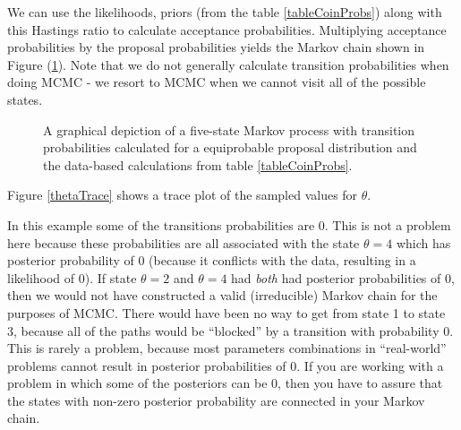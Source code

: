 \documentclass[11pt]{article}
\begin{document}
We can use the likelihoods, priors (from the table \ref{tableCoinProbs}) along with this Hastings ratio to calculate acceptance probabilities.
Multiplying acceptance probabilities by the proposal probabilities yields the Markov chain shown in Figure (\ref{fig5stateConcrete}).
Note that we do not generally calculate transition probabilities when doing MCMC - we resort to MCMC when we cannot visit all of the possible states.
\begin{figure}[h]
\caption{A graphical depiction of a five-state Markov process with transition probabilities calculated for a equiprobable proposal distribution and the data-based calculations from table \ref{tableCoinProbs}. }\label{fig5stateConcrete}
\end{figure}

Figure \ref{thetaTrace} shows a trace plot of the sampled values for $\theta$.

In this example some of the transitions probabilities are 0.
This is not a problem here because these probabilities are all associated with the state $\theta=4$ which has posterior probability of 0 (because it conflicts with the data, resulting in a likelihood of 0).
If state $\theta=2$ and $\theta=4$ had {\em both} had posterior probabilities of 0, then we would not have constructed a valid (irreducible) Markov chain for the purposes of MCMC.  
There would have been no way to get from state 1 to state 3, because all of the paths would be ``blocked'' by a transition with probability 0.
This is rarely a problem, because most parameters combinations in ``real-world'' problems cannot result in posterior probabilities of 0.
If you are working with a problem in which some of the posteriors can be 0, then you have to assure that the states with non-zero posterior probability are connected in your Markov chain.
\end{document}
